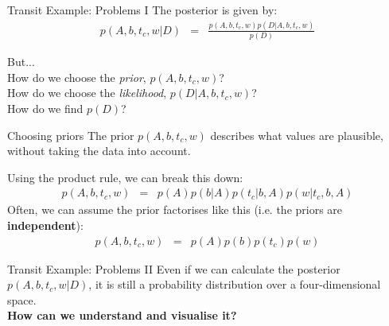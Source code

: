 \begin{frame}[fragile, t]{Transit Example: Problems I}
The posterior is given by:
\begin{eqnarray*}
p(A, b, t_c, w | D) &=& \frac{p(A, b, t_c, w)p(D | A, b, t_c, w)}{p(D)}
\end{eqnarray*}

But...\\
How do we choose the {\it prior}, $p(A, b, t_c, w)$?\\
How do we choose the {\it likelihood}, $p(D | A, b, t_c, w)$?\\
How do we find $p(D)$?
\end{frame}


\begin{frame}[t]{Choosing priors}
The prior $p(A, b, t_c, w)$
describes what values are plausible, without taking the data into account.

Using the product rule, we can break this down:
\begin{eqnarray*}
p(A, b, t_c, w) &=& p(A) p(b | A) p(t_c | b, A) p(w | t_c, b, A)
\end{eqnarray*}
Often, we can assume the prior factorises like this (i.e. the priors are
{\bf independent}):
\begin{eqnarray*}
p(A, b, t_c, w) &=& p(A) p(b) p(t_c) p(w)
\end{eqnarray*}


\end{frame}



\begin{frame}[fragile, t]{Transit Example: Problems II}
Even if we can calculate the posterior $p(A, b, t_c, w | D)$, it is still a
probability distribution over a four-dimensional space.\\
\vspace{20pt}
{\bf How can we understand and visualise it?}
\end{frame}




